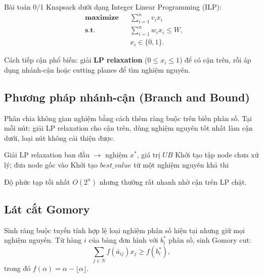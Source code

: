 Bài toán 0/1 Knapsack dưới dạng Integer Linear Programming (ILP):
\[
\begin{aligned}
& \textbf{maximize} && \sum_{i=1}^n v_i x_i \\
& \textbf{s.t.} && \sum_{i=1}^n w_i x_i \le W, \\
& && x_i\in\{0,1\}.
\end{aligned}
\]

Cách tiếp cận phổ biến: giải \textbf{LP relaxation} ($0\le x_i\le 1$) để có cận trên, rồi áp dụng nhánh-cận hoặc cutting planes để tìm nghiệm nguyên.

\subsection{Phương pháp nhánh-cận (Branch and Bound)}

Phân chia không gian nghiệm bằng cách thêm ràng buộc trên biến phân số. Tại mỗi nút: giải LP relaxation cho cận trên, dùng nghiệm nguyên tốt nhất làm cận dưới, loại nút không cải thiện được.

\begin{algorithm}[H]
\caption{Branch-and-Bound cho knapsack 0/1}
Giải LP relaxation ban đầu $\rightarrow$ nghiệm $x^*$, giá trị $UB$\;
Khởi tạo tập node chưa xử lý; đưa node gốc vào\;
Khởi tạo $best\_value$ từ một nghiệm nguyên khả thi\;
\;
\end{algorithm}

Độ phức tạp tồi nhất $O(2^n)$ nhưng thường rất nhanh nhờ cận trên LP chặt.

\subsection{Lát cắt Gomory}

Sinh ràng buộc tuyến tính hợp lệ loại nghiệm phân số hiện tại nhưng giữ mọi nghiệm nguyên. Từ hàng $i$ của bảng đơn hình với $b_i^*$ phân số, sinh Gomory cut:
\[
\sum_{j\in N} f(\bar a_{ij})x_j \ge f(b_i^*),
\]
trong đó $f(\alpha)=\alpha-\lfloor\alpha\rfloor$.

